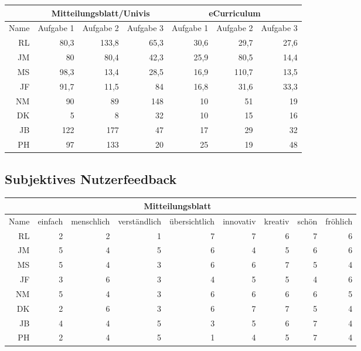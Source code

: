 \documentclass[a4paper,10pt]{scrartcl}
\begin{document}
\begin{center}
\begin{tabular}{r|r|r|r|r|r|r}
     & \multicolumn{3}{c|}{Mitteilungsblatt/Univis} & \multicolumn{3}{c}{eCurriculum} \\ \hline
    Name & Aufgabe 1 & Aufgabe 2 & Aufgabe 3 & Aufgabe 1 & Aufgabe 2 & Aufgabe 3  \\ \hline
    RL & 80,3 & 133,8 & 65,3 & 30,6 & 29,7 & 27,6 \\ \hline
    JM & 80 & 80,4 & 42,3 & 25,9 & 80,5 & 14,4 \\ \hline
    MS & 98,3 & 13,4 & 28,5 & 16,9 & 110,7 & 13,5 \\ \hline
    JF & 91,7 & 11,5 & 84 & 16,8 & 31,6 & 33,3 \\ \hline
    NM & 90 & 89 & 148 & 10 & 51 & 19\\ \hline
    DK & 5 & 8 & 32 & 10 & 15 & 16\\ \hline
    JB & 122 & 177 & 47 & 17 & 29 & 32 \\ \hline
    PH & 97 & 133 & 20 & 25 & 19 & 48 \\
\end{tabular}
\end{center}

\subsection*{Subjektives Nutzerfeedback} 

\begin{center}
\begin{tabular}{r|r|r|r|r|r|r|r|r}
     & \multicolumn{7}{c}{Mitteilungsblatt} \\ \hline
    Name & einfach & menschlich & verständlich & übersichtlich & innovativ & kreativ & schön & fröhlich \\ \hline
    RL & 2 & 2 & 1 & 7 & 7 & 6 & 7 & 6 \\ \hline
    JM & 5 & 4 & 5 & 6 & 4 & 5 & 6 & 6 \\ \hline
    MS & 5 & 4 & 3 & 6 & 6 & 7 & 5 & 4 \\ \hline
    JF & 3 & 6 & 3 & 4 & 5 & 5 & 4 & 6 \\ \hline
    NM & 5 & 4 & 3 & 6 & 6 & 6 & 6 & 5 \\ \hline
    DK & 2 & 6 & 3 & 6 & 7 & 7 & 5 & 4 \\ \hline
    JB & 4 & 4 & 5 & 3 & 5 & 6 & 7 & 4 \\ \hline
    PH & 2 & 4 & 5 & 1 & 4 & 5 & 7 & 4 \\
\end{tabular}
\end{center}
\end{document}
